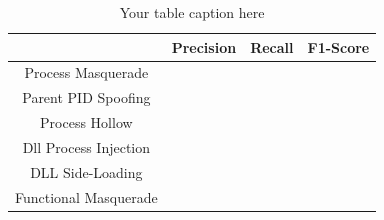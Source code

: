 

\begin{table}[h]
\centering
\begin{tabular}{|c|c|c|c}
\hline
 & Precision & Recall & F1-Score \\
\hline
Process Masquerade & & &  \\
\hline
Parent PID Spoofing & & &  \\
\hline
Process Hollow & & &  \\
\hline
Dll Process Injection & & &  \\
\hline
DLL Side-Loading & & &  \\
\hline
Functional Masquerade  & & &  \\
\hline
\end{tabular}
\caption{Your table caption here}
\label{tab:my_label}
\end{table}

